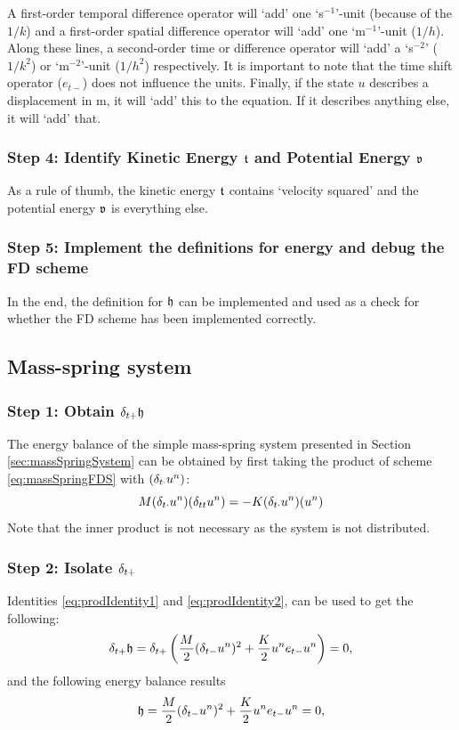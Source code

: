 {{A first-order temporal difference operator will `add' one `s$^{-1}$'-unit (because of the $1/k$) and a first-order spatial difference operator will `add' one `m$^{-1}$'-unit ($1/h$). Along these lines, a second-order time or difference operator will `add' a `s$^{-2}$' ($1/k^2$) or `m$^{-2}$'-unit ($1/h^2$) respectively. It is important to note that the time shift operator ($e_{t-}$) does not influence the units. Finally, if the state $u$ describes a displacement in m, it will `add' this to the equation. If it describes anything else, it will `add' that.

\subsubsection{Step 4: Identify Kinetic Energy $\mathfrak{t}$ and Potential Energy $\mathfrak{v}$}
As a rule of thumb, the kinetic energy $\mathfrak{t}$ contains `velocity squared' and the potential energy $\mathfrak{v}$ is everything else. 

\subsubsection{Step 5: Implement the definitions for energy and debug the FD scheme}
In the end, the definition for $\mathfrak{h}$ can be implemented and used as a check for whether the FD scheme has been implemented correctly.

\subsection{Mass-spring system}
\subsubsection{Step 1: Obtain $\delta_{t+} \mathfrak{h}$}
The energy balance of the simple mass-spring system presented in Section \ref{sec:massSpringSystem} can be obtained by first taking the product of scheme \eqref{eq:massSpringFDS} with $(\delta_{t\cdot} u^n)$:
\begin{equation*}
    M(\delta_{t\cdot}u^n)(\delta_{tt} u^n) = -K(\delta_{t\cdot}u^n)(u^n)
\end{equation*}
Note that the inner product is not necessary as the system is not distributed. 

\subsubsection{Step 2: Isolate $\delta_{t+}$}
Identities \eqref{eq:prodIdentity1} and \eqref{eq:prodIdentity2}, can be used to get the following:
\begin{equation}
    \delta_{t+} \mathfrak{h} = \delta_{t+}\left(\frac{M}{2}(\delta_{t-}u^n)^2 + \frac{K}{2}u^n e_{t-}u^n\right) = 0,
\end{equation}
and the following energy balance results 
\begin{equation}\label{eq:energyBalanceMassSpring}
    \mathfrak{h} = \frac{M}{2}(\delta_{t-}u^n)^2 + \frac{K}{2}u^n e_{t-}u^n = 0,
\end{equation}

}}
